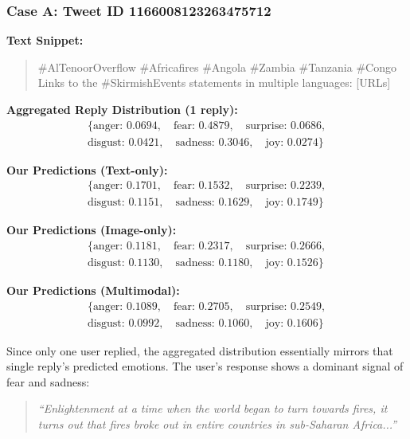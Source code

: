 \subsubsection*{Case A: Tweet ID 1166008123263475712}

\noindent\textbf{Text Snippet:}
\begin{quote}
\#AlTenoorOverflow \#Africafires \#Angola \#Zambia \#Tanzania \#Congo \\
Links to the \#SkirmishEvents statements in multiple languages: [URLs]
\end{quote}

\noindent\textbf{Aggregated Reply Distribution (1 reply):}
\[
\begin{aligned}
\{\text{anger: } 0.0694, \quad \text{fear: } 0.4879, \quad \text{surprise: } 0.0686, \\
\text{disgust: } 0.0421, \quad \text{sadness: } 0.3046, \quad \text{joy: } 0.0274\}
\end{aligned}
\]

\noindent\textbf{Our Predictions (Text-only):}
\[
\begin{aligned}
\{\text{anger: } 0.1701, \quad \text{fear: } 0.1532, \quad \text{surprise: } 0.2239, \\
\text{disgust: } 0.1151, \quad \text{sadness: } 0.1629, \quad \text{joy: } 0.1749\}
\end{aligned}
\]

\noindent\textbf{Our Predictions (Image-only):}
\[
\begin{aligned}
\{\text{anger: } 0.1181, \quad \text{fear: } 0.2317, \quad \text{surprise: } 0.2666, \\
\text{disgust: } 0.1130, \quad \text{sadness: } 0.1180, \quad \text{joy: } 0.1526\}
\end{aligned}
\]

\noindent\textbf{Our Predictions (Multimodal):}
\[
\begin{aligned}
\{\text{anger: } 0.1089, \quad \text{fear: } 0.2705, \quad \text{surprise: } 0.2549, \\
\text{disgust: } 0.0992, \quad \text{sadness: } 0.1060, \quad \text{joy: } 0.1606\}
\end{aligned}
\]

Since only one user replied, the aggregated distribution essentially mirrors that single reply’s predicted emotions. The user’s response shows a dominant signal of fear and sadness:

\begin{quote}
\emph{``Enlightenment at a time when the world began to turn towards fires, 
it turns out that fires broke out in entire countries in sub-Saharan Africa...''}
\end{quote}

